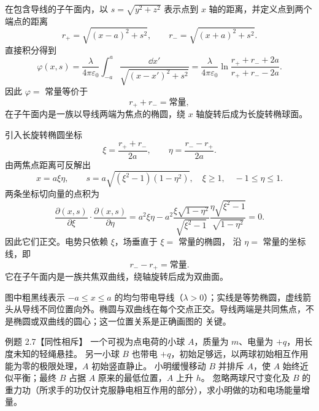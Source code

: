 \begin{xesolution}
在包含导线的子午面内，以 $s=\sqrt{y^2+z^2}$ 表示点到 $x$ 轴的距离，并定义点到两个端点的距离
\[
  r_+=\sqrt{(x-a)^2+s^2},
  \qquad r_-=\sqrt{(x+a)^2+s^2}.
\]
直接积分得到
\[
  \varphi(x,s)=\frac{\lambda}{4\pi\varepsilon_0}
  \int_{-a}^{a}\frac{\dd x'}{\sqrt{(x-x')^2+s^2}}
  =\boxed{\frac{\lambda}{4\pi\varepsilon_0}
  \ln\frac{r_++r_-+2a}{r_++r_--2a}}.
\]
因此 $\varphi=$ 常量等价于
\[
  \boxed{r_++r_-=\text{常量}},
\]
在子午面内是一族以导线两端为焦点的椭圆，绕 $x$ 轴旋转后成为长旋转椭球面。

引入长旋转椭圆坐标
\[
  \xi=\frac{r_++r_-}{2a},
  \qquad \eta=\frac{r_--r_+}{2a}.
\]
由两焦点距离可反解出
\[
 x=a\xi\eta,\qquad s=a\sqrt{(\xi^2-1)(1-\eta^2)},\quad \xi\ge1,\quad -1\le\eta\le1.
\]
两条坐标切向量的点积为
\[
 \frac{\partial(x,s)}{\partial\xi}\cdot\frac{\partial(x,s)}{\partial\eta}
 =a^2\xi\eta-
 a^2\frac{\xi\sqrt{1-\eta^2}}{\sqrt{\xi^2-1}}
 \frac{\eta\sqrt{\xi^2-1}}{\sqrt{1-\eta^2}}=0.
\]
因此它们正交。电势只依赖 $\xi$，场垂直于 $\xi=$ 常量的椭圆，
沿 $\eta=$ 常量的坐标线，即
\[
  \boxed{r_--r_+=\text{常量}}.
\]
它在子午面内是一族共焦双曲线，绕轴旋转后成为双曲面。

\finiteRodFamiliesFigure

图中粗黑线表示 $-a\le x\le a$ 的均匀带电导线（$\lambda>0$）；实线是等势椭圆，虚线箭头从导线不同位置向外。椭圆与双曲线在每个交点正交。导线两端是共同焦点，不是椭圆或双曲线的圆心；这一位置关系是正确画图的
关键。
\end{xesolution}

\begin{origexamplebox}{例题 2.7【同性相斥】}
一个可视为点电荷的小球 $A$，质量为 $m$、电量为 $+q$，用长度未知的轻绳悬挂。
另一小球 $B$ 也带电 $+q$，初始足够远，以两球初始相互作用能为零的极限处理，$A$ 初始竖直静止。
小明缓慢移动 $B$ 并排斥 $A$，使 $A$ 始终近似平衡；最终 $B$ 占据 $A$ 原来的最低位置，$A$ 上升 $h$。
忽略两球尺寸变化及 $B$ 的重力功（所求手的功仅计克服静电相互作用的部分），求小明做的功和电场能量增量。
\emRepellingQuestion
{}\label{fig:em-source-thirty-third-section-7}
\end{origexamplebox}

